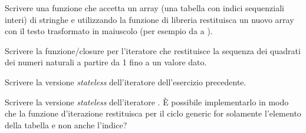 \begin{Exercise}[label=iter-02]
Scrivere una funzione che accetta un array (una tabella con indici sequenziali
interi) di stringhe e utilizzando la funzione di libreria 
restituisca un nuovo array con il testo trasformato in maiuscolo (per esempio da
 a ).
\end{Exercise}

\begin{Exercise}[label=iter-03]
Scrivere la funzione/closure per l'iteratore che restituisce la sequenza dei
quadrati dei numeri naturali a partire da 1 fino a un valore dato.
\end{Exercise}

\begin{Exercise}[label=iter-04]
Scrivere la versione \emph{stateless} dell'iteratore dell'esercizio precedente.
\end{Exercise}

\begin{Exercise}[label=iter-05]
Scrivere la versione \emph{stateless} dell'iteratore . È possibile
implementarlo in modo che la funzione d'iterazione restituisca per il ciclo
generic for solamente l'elemento della tabella e non anche l'indice?
\end{Exercise}


